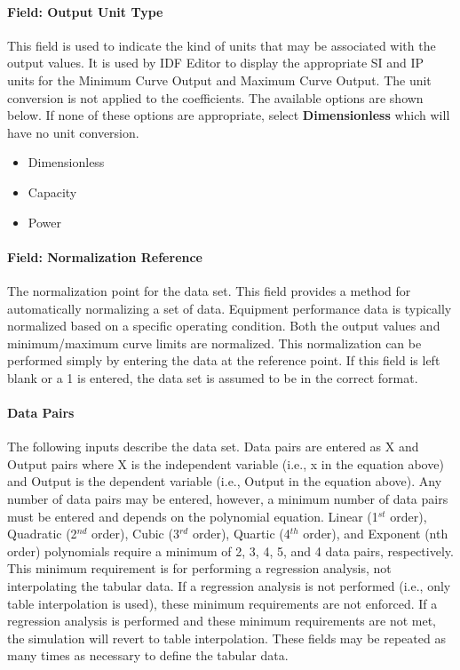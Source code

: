 \paragraph{Field: Output Unit Type}\label{field-output-unit-type-000}

This field is used to indicate the kind of units that may be associated with the output values. It is used by IDF Editor to display the appropriate SI and IP units for the Minimum Curve Output and Maximum Curve Output. The unit conversion is not applied to the coefficients. The available options are shown below. If none of these options are appropriate, select \textbf{Dimensionless} which will have no unit conversion.

\begin{itemize}
\item
  Dimensionless
\item
  Capacity
\item
  Power
\end{itemize}

\paragraph{Field: Normalization Reference}\label{field-normalization-reference}

The normalization point for the data set. This field provides a method for automatically normalizing a set of data. Equipment performance data is typically normalized based on a specific operating condition. Both the output values and minimum/maximum curve limits are normalized. This normalization can be performed simply by entering the data at the reference point. If this field is left blank or a 1 is entered, the data set is assumed to be in the correct format.

\paragraph{Data Pairs}\label{data-pairs}

The following inputs describe the data set. Data pairs are entered as X and Output pairs where X is the independent variable (i.e., x in the equation above) and Output is the dependent variable (i.e., Output in the equation above). Any number of data pairs may be entered, however, a minimum number of data pairs must be entered and depends on the polynomial equation. Linear (1\(^{st}\) order), Quadratic (2\(^{nd}\) order), Cubic (3\(^{rd}\) order), Quartic (4\(^{th}\) order), and Exponent (nth order) polynomials require a minimum of 2, 3, 4, 5, and 4 data pairs, respectively. This minimum requirement is for performing a regression analysis, not interpolating the tabular data. If a regression analysis is not performed (i.e., only table interpolation is used), these minimum requirements are not enforced. If a regression analysis is performed and these minimum requirements are not met, the simulation will revert to table interpolation. These fields may be repeated as many times as necessary to define the tabular data.

